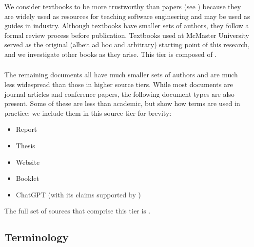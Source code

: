 We consider textbooks to be more trustworthy than papers (see )
because they are widely used as resources for teaching software engineering and
may be used as guides in industry.
Although textbooks have smaller sets of
authors, they follow a formal review process before publication. Textbooks used
at McMaster University \citep{Patton2006,PetersAndPedrycz2000,vanVliet2000}
served as the original (albeit ad hoc and arbitrary) starting point of this
research, and we investigate other books as they arise. \addTextEx{}
This tier is composed of .

\subsubsection{}
\label{papers}

The remaining documents all have much smaller sets of authors and are much less
widespread than those in higher source tiers. While most documents are
journal articles and conference papers, the following document types are also
present. Some of these are less than academic, but show how terms are used in
practice; we include them in this source tier for brevity:

\begin{itemize}
    \item Report \citep{Kam2008,Gerrard2000a,Gerrard2000b}
    \item Thesis \citep{Bas2024}
    \item Website \citep{LambdaTest2024,Pandey2023}
    \item Booklet \citep{SPICE2022}
    \item \ifnotpaper \else ChatGPT \fi \citet{ChatGPT2024} (with its claims
          supported by \citet{RusEtAl2008})
\end{itemize}

The full set of sources that comprise this tier is .

\ifnotpaper\else
    \begin{table*}[t!]
        \ieeeCatsTable{}
    \end{table*}
\fi

\subsection{Terminology}
\label{terminology}

